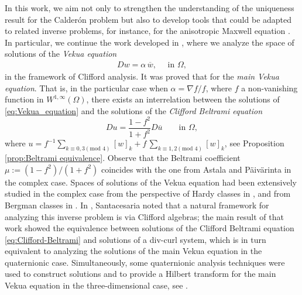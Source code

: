 \documentclass[12pt]{article}
\begin{document}
In this work, we aim not only to strengthen the understanding of the uniqueness result for the Calderón problem but also to develop tools that could be adapted to related inverse problems, for instance, for the anisotropic Maxwell equation \cite{Salo-2009}.
In particular, we continue the work developed in \cite{Delgado2023}, where we analyze the space of solutions of the \textit{Vekua equation} 
\begin{align}\label{eq:Vekua_equation}
   D w=\alpha\, \overline{w}, \quad \text{ in }\Omega,
\end{align}
in the framework of Clifford analysis. It was proved that for the \textit{main Vekua equation}. That is, in the particular case when $\alpha=\nabla f/f$, where $f$ a non-vanishing function in $W^{1,\infty}(\Omega)$, there exists an interrelation between the solutions of \eqref{eq:Vekua_equation} and the  solutions of the \textit{Clifford Beltrami equation}
\begin{equation}\label{eq:Clifford-Beltrami}
    Du=\dfrac{1-f^2}{1+f^2} D\overline{u}\qquad \text{in }\Omega,
\end{equation}
where $u=f^{-1}\sum_{k\equiv 0,3 (\text{mod } 4)} [w]_k+f\, \sum_{k\equiv 1,2 (\text{mod } 4)} [w]_k$, see Proposition \ref{prop:Beltrami equivalence}. Observe that the Beltrami coefficient $\mu:=(1-f^2)/(1+f^2)$ coincides with the one from Astala and P\"aiv\"arinta \cite{AstPai2006, Astala-2} in the complex case. 
Spaces of solutions of the Vekua equation had been extensively studied in the complex case from the perspective of Hardy classes in \cite{BLRR2010, BFL2011}, and from Bergman classes in \cite{DelLeb2019, Vicente2025}. In \cite{Santa2019}, Santacesaria noted that a natural framework for analyzing this inverse problem is via Clifford algebras; the main result of that work showed the equivalence between solutions of the Clifford Beltrami equation \eqref{eq:Clifford-Beltrami} and solutions of a div-curl system, which is in turn equivalent to analyzing the solutions of the main Vekua equation in the quaternionic case. Simultaneously, some quaternionic analysis techniques were used to construct solutions and to provide a Hilbert transform for the main Vekua equation in the three-dimensional case, see \cite{DelPor2018, DelPor2019}.
\end{document}
